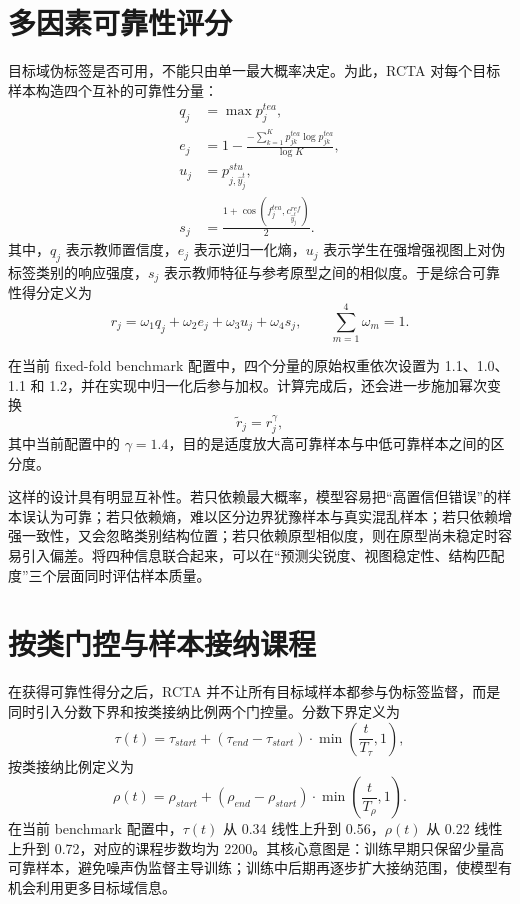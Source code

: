 \section{多因素可靠性评分}
目标域伪标签是否可用，不能只由单一最大概率决定。为此，RCTA 对每个目标样本构造四个互补的可靠性分量：
\begin{align}
q_j &= \max p_j^{tea},\\
e_j &= 1-\frac{-\sum_{k=1}^{K}p_{jk}^{tea}\log p_{jk}^{tea}}{\log K},\\
u_j &= p_{j,\hat{y}_j^t}^{stu},\\
s_j &= \frac{1+\cos(f_j^{tea},c_{\hat{y}_j^t}^{ref})}{2}.
\end{align}
其中，$q_j$ 表示教师置信度，$e_j$ 表示逆归一化熵，$u_j$ 表示学生在强增强视图上对伪标签类别的响应强度，$s_j$ 表示教师特征与参考原型之间的相似度。于是综合可靠性得分定义为
\begin{equation}
r_j=
\omega_1 q_j+\omega_2 e_j+\omega_3 u_j+\omega_4 s_j,
\qquad
\sum_{m=1}^{4}\omega_m=1.
\end{equation}

在当前 fixed-fold benchmark 配置中，四个分量的原始权重依次设置为 1.1、1.0、1.1 和 1.2，并在实现中归一化后参与加权。计算完成后，还会进一步施加幂次变换
\begin{equation}
\tilde{r}_j=r_j^{\gamma},
\end{equation}
其中当前配置中的 $\gamma=1.4$，目的是适度放大高可靠样本与中低可靠样本之间的区分度。

这样的设计具有明显互补性。若只依赖最大概率，模型容易把“高置信但错误”的样本误认为可靠；若只依赖熵，难以区分边界犹豫样本与真实混乱样本；若只依赖增强一致性，又会忽略类别结构位置；若只依赖原型相似度，则在原型尚未稳定时容易引入偏差。将四种信息联合起来，可以在“预测尖锐度、视图稳定性、结构匹配度”三个层面同时评估样本质量。

\section{按类门控与样本接纳课程}
在获得可靠性得分之后，RCTA 并不让所有目标域样本都参与伪标签监督，而是同时引入分数下界和按类接纳比例两个门控量。分数下界定义为
\begin{equation}
\tau(t)=\tau_{start}
+(\tau_{end}-\tau_{start})\cdot
\min\left(\frac{t}{T_{\tau}},1\right),
\end{equation}
按类接纳比例定义为
\begin{equation}
\rho(t)=\rho_{start}
+(\rho_{end}-\rho_{start})\cdot
\min\left(\frac{t}{T_{\rho}},1\right).
\end{equation}
在当前 benchmark 配置中，$\tau(t)$ 从 0.34 线性上升到 0.56，$\rho(t)$ 从 0.22 线性上升到 0.72，对应的课程步数均为 2200。其核心意图是：训练早期只保留少量高可靠样本，避免噪声伪监督主导训练；训练中后期再逐步扩大接纳范围，使模型有机会利用更多目标域信息。

